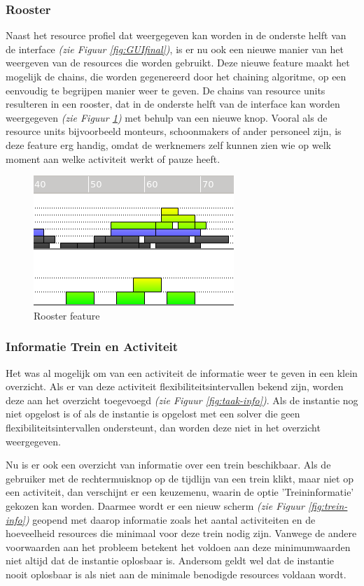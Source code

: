 \subsubsection{Rooster}
Naast het resource profiel dat weergegeven kan worden in de onderste helft van de interface \emph{(zie Figuur \ref{fig:GUIfinal})}, is er nu ook een nieuwe manier van het weergeven van de resources die worden gebruikt. Deze nieuwe feature maakt het mogelijk de chains, die worden gegenereerd door het chaining algoritme, op een eenvoudig te begrijpen manier weer te geven. De chains van resource units resulteren in een rooster, dat in de onderste helft van de interface kan worden weergegeven \emph{(zie Figuur \ref{fig:rooster})} met behulp van een nieuwe knop. Vooral als de resource units bijvoorbeeld monteurs, schoonmakers of ander personeel zijn, is deze feature erg handig, omdat de werknemers zelf kunnen zien wie op welk moment aan welke activiteit werkt of pauze heeft. 

\begin{figure}[H]
\center
\includegraphics[width=.5\textwidth]{../images/rooster.png}
\caption{Rooster feature}
\label{fig:rooster}
\end{figure}

\subsubsection{Informatie Trein en Activiteit}
Het was al mogelijk om van een activiteit de informatie weer te geven in een klein overzicht. Als er van deze activiteit flexibiliteitsintervallen bekend zijn, worden deze aan het overzicht toegevoegd \emph{(zie Figuur \ref{fig:taak-info})}. Als de instantie nog niet opgelost is of als de instantie is opgelost met een solver die geen flexibiliteitsintervallen ondersteunt, dan worden deze niet in het overzicht weergegeven.  

Nu is er ook een overzicht van informatie over een trein beschikbaar. Als de gebruiker met de rechtermuisknop op de tijdlijn van een trein klikt, maar niet op een activiteit, dan verschijnt er een keuzemenu, waarin de optie 'Treininformatie' gekozen kan worden. Daarmee wordt er een nieuw scherm \emph{(zie Figuur \ref{fig:trein-info})} geopend met daarop informatie zoals het aantal activiteiten en de hoeveelheid resources die minimaal voor deze trein nodig zijn. Vanwege de andere voorwaarden aan het probleem betekent het voldoen aan deze minimumwaarden niet altijd dat de instantie oplosbaar is. Andersom geldt wel dat de instantie nooit oplosbaar is als niet aan de minimale benodigde resources voldaan wordt.

